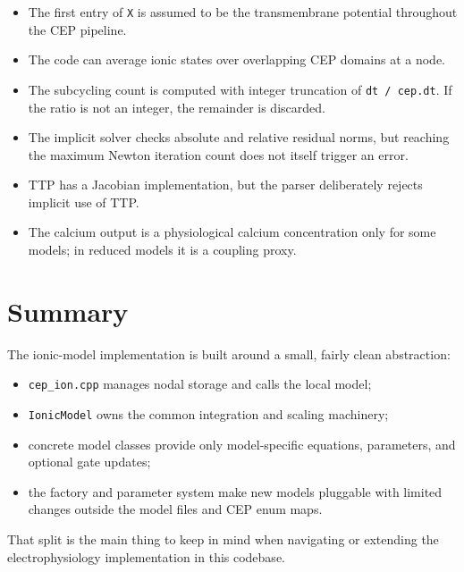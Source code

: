\documentclass[11pt]{article}
\begin{document}
\begin{itemize}[leftmargin=*]
\item The first entry of \texttt{X} is assumed to be the transmembrane potential throughout the CEP pipeline.
\item The code can average ionic states over overlapping CEP domains at a node.
\item The subcycling count is computed with integer truncation of \texttt{dt / cep.dt}. If the ratio is not an integer, the remainder is discarded.
\item The implicit solver checks absolute and relative residual norms, but reaching the maximum Newton iteration count does not itself trigger an error.
\item TTP has a Jacobian implementation, but the parser deliberately rejects implicit use of TTP.
\item The calcium output is a physiological calcium concentration only for some models; in reduced models it is a coupling proxy.
\end{itemize}

\section{Summary}

The ionic-model implementation is built around a small, fairly clean abstraction:
\begin{itemize}[leftmargin=*]
\item \texttt{cep\_ion.cpp} manages nodal storage and calls the local model;
\item \texttt{IonicModel} owns the common integration and scaling machinery;
\item concrete model classes provide only model-specific equations, parameters, and optional gate updates;
\item the factory and parameter system make new models pluggable with limited changes outside the model files and CEP enum maps.
\end{itemize}

That split is the main thing to keep in mind when navigating or extending the electrophysiology implementation in this codebase.
\end{document}
